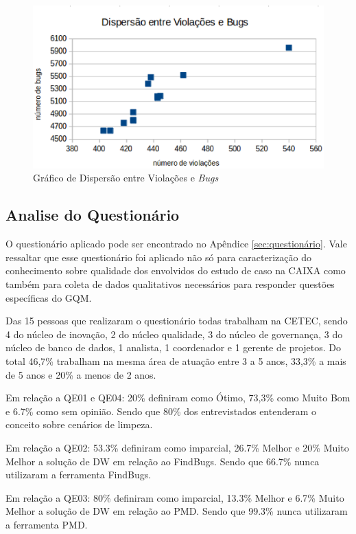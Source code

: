 \begin{figure}[H]
\centering
\includegraphics[keepaspectratio=false,scale=0.7]{figuras/figuras_nilton/dispersaoviolacoesbugs.eps}
\caption{Gráfico de Dispersão entre Violações e \textit{Bugs}}
\label{dispersaoviolacoesbugs}
\end{figure}

\subsection{Analise do Questionário}

O questionário aplicado pode ser encontrado no Apêndice \ref{sec:questionário}. Vale ressaltar que esse questionário foi aplicado não só para caracterização do conhecimento sobre qualidade dos envolvidos do estudo de caso na CAIXA como também para coleta de dados qualitativos necessários para responder questões específicas do GQM. 

Das 15 pessoas que realizaram o questionário todas trabalham na CETEC, sendo 4 do núcleo de inovação, 2 do núcleo qualidade, 3 do núcleo de governança, 3 do núcleo de banco de dados, 1 analista, 1 coordenador e 1 gerente de projetos. Do total 46,7\% trabalham na mesma área de atuação entre 3 a 5 anos, 33,3\% a mais de 5 anos e 20\% a menos de 2 anos. 

Em relação a QE01 e QE04: 20\% definiram como Ótimo, 73,3\% como Muito Bom e 6.7\% como sem opinião. Sendo que 80\% dos entrevistados entenderam o conceito sobre cenários de limpeza.

Em relação a QE02: 53.3\% definiram como imparcial, 26.7\% Melhor e 20\% Muito Melhor a solução de DW em relação ao FindBugs. Sendo que 66.7\% nunca utilizaram a ferramenta FindBugs.

Em relação a QE03: 80\% definiram como imparcial, 13.3\% Melhor e 6.7\% Muito Melhor a solução de DW em relação ao PMD. Sendo que 99.3\% nunca utilizaram a ferramenta PMD.

